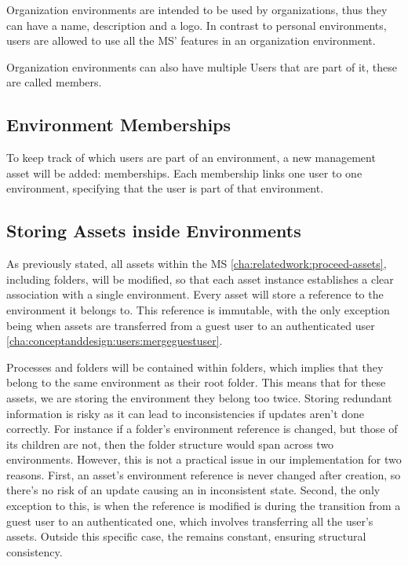 Organization environments are intended to be used by organizations, thus they can have a
name, description and a logo.
In contrast to personal environments, users are allowed to use all the MS' features in
an organization environment.


Organization environments can also have multiple Users that are part of it, these are
called members.

\subsection{Environment Memberships}
\label{cha:conceptanddesign:environments:memberships}

To keep track of which users are part of an environment, a new management asset will be
added: memberships.
Each membership links one user to one environment, specifying that the user is part of
that environment.

\subsection{Storing Assets inside Environments}
\label{cha:conceptanddesign:environments:storing-assets}

As previously stated, all assets within the MS \ref{cha:relatedwork:proceed-assets}, including folders,
will be modified, so that each asset instance establishes a clear association with a single environment.
Every asset will store a reference to the environment it belongs to.
This reference is immutable, with the only exception being when assets are transferred
from a guest user to an authenticated user \ref{cha:conceptanddesign:users:mergeguestuser}.

Processes and folders will be contained within folders, which implies that they belong to
the same environment as their root folder.
This means that for these assets, we are storing the environment they belong too twice.
Storing redundant information is risky as it can lead to inconsistencies if updates aren't
done correctly.
For instance if a folder's environment reference is changed, but those of its children
are not, then the folder structure would span across two environments.
However, this is not a practical issue in our implementation for two reasons.
First, an asset's environment reference is
never changed after creation, so there’s no risk of an update causing an in inconsistent
state.
Second, the only exception to this, is when the reference is modified is during the transition from a
guest user to an authenticated one, which involves transferring all the user's assets.
Outside this specific case, the remains constant, ensuring structural consistency.

